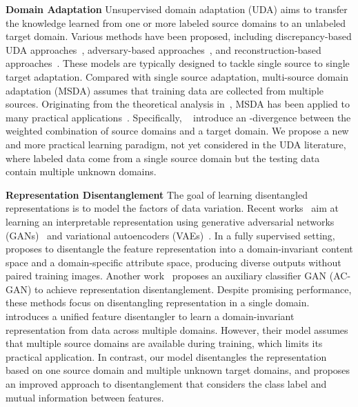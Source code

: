 \documentclass{article}
\begin{document}
\textbf{Domain Adaptation} Unsupervised domain adaptation (UDA) aims to transfer the knowledge learned from one or more labeled source domains to an unlabeled target domain. Various methods have been proposed, including discrepancy-based UDA approaches~\cite{JAN, ddc, ghifary2014domain, peng2017synthetic}, adversary-based approaches~\cite{cogan, adda, ufdn}, and reconstruction-based approaches~\cite{yi2017dualgan, CycleGAN2017, hoffman2017cycada, kim2017learning}. These models are typically designed to tackle single source to single target adaptation. Compared with single source  adaptation, multi-source domain adaptation (MSDA) assumes that training data are collected from multiple sources. Originating from the theoretical analysis in~\cite{ben2010theory, Mansour_nips2018, crammer2008learning}, MSDA has been applied to many practical applications~\cite{xu2018deep, duan2012exploiting, domainnet}. Specifically, ~\citet{ben2010theory} introduce an -divergence between the weighted combination of source domains and a target domain. 
We propose a new and more practical learning paradigm, not yet considered in the UDA literature, where labeled data come from a single source domain but the testing data contain multiple unknown domains. 

\textbf{Representation Disentanglement} The goal of learning disentangled representations is to model the factors of data variation. Recent works~\cite{mathieu2016disentangling, makhzani2015adversarial, ufdn, cisac_gan} aim at learning an interpretable representation using generative adversarial networks (GANs)~\cite{gan, kingma2014semi} and variational  autoencoders (VAEs)~\cite{stochastic_icml_2014, vae}. In a fully supervised setting, \citet{drit} proposes to disentangle the feature representation into a domain-invariant content space and a domain-specific attribute space, producing diverse outputs without paired training images. Another work~\cite{cisac_gan} proposes an auxiliary classifier GAN (AC-GAN) to achieve representation disentanglement. Despite promising performance, these methods focus on disentangling representation in a single domain. ~\citet{ufdn} introduces a unified feature disentangler to learn a domain-invariant representation from data across multiple domains. However, their model assumes that multiple source domains are available during training, which limits its practical application. In contrast, our model disentangles the representation based on one source domain and multiple unknown target domains, and proposes an improved approach to disentanglement that considers the class label and mutual information between features.
\end{document}
